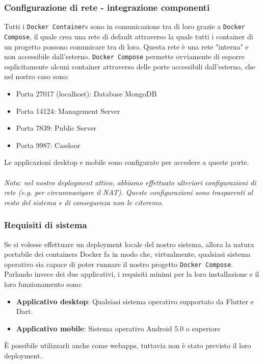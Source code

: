 \documentclass{article}
\begin{document}
\subsubsection{Configurazione di rete - integrazione componenti}
Tutti i \texttt{Docker Container}s sono in comunicazione tra di loro grazie a  \texttt{Docker Compose}, il quale crea una rete di default attraverso la quale tutti i container di un progetto possono comunicare tra di loro.
Questa rete è una rete "interna" e non accessibile dall'esterno. \texttt{Docker Compose} permette ovviamente di esporre esplicitamente alcuni container attraverso delle porte accessibili dall'esterno, che nel nostro caso sono:
\begin{itemize}
  \item Porta 27017 (localhost): Database MongoDB
	\item Porta 14124: Management Server
	\item Porta 7839: Public Server
	\item Porta 9987: Casdoor
\end{itemize}
Le applicazioni desktop e mobile sono configurate per accedere a queste porte. 
\\\\
\noindent
\textit{Nota: nel nostro deployment attivo, abbiamo effettuato ulteriori configurazioni di rete (e.g. per circumnavigare il NAT). Queste configurazioni sono trasparenti al resto del sistema e di conseguenza non le citeremo.}


\subsubsection{Requisiti di sistema}
Se si volesse effettuare un deployment locale del nostro sistema, allora la natura portabile dei containers Docker fa in modo che, virtualmente, qualsiasi sistema operativo sia capace di poter runnare il nostro progetto \texttt{Docker Compose}.\\
Parlando invece dei due applicativi, i requisiti minimi per la loro installazione e il loro funzionamento sono:
\begin{itemize}
    \item \textbf{Applicativo desktop}: Qualsiasi sistema operativo supportato da Flutter e Dart.
    \item \textbf{Applicativo mobile}: Sistema operativo Android 5.0 o superiore
\end{itemize}
È possibile utilizzarli anche come webapps, tuttavia non è stato previsto il loro deployment.
\end{document}
